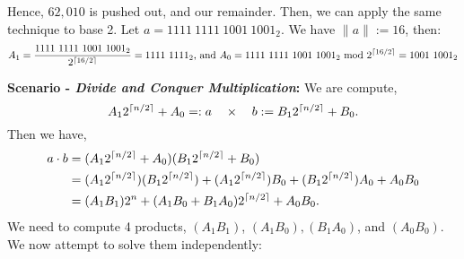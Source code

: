 \noindent
Hence, $62,010$ is pushed out, and our remainder. Then, we can apply the same technique to base 2.
Let $a=1111\ 1111\ 1001\ 1001_2$. We have $\|a\|:=16$, then:
\[ A_1=\frac{1111\ 1111\ 1001\ 1001_2}{2^{\ceil{16/2}}}=1111\ 1111_2 \text{, and } A_0=1111\ 1111\ 1001\ 1001_2 \text{ mod } 2^{\ceil{16/2}}=1001\ 1001_2 \]

\newpage
\noindent
\textbf{Scenario - \textit{Divide and Conquer Multiplication}:} We are compute, 
\[A_1 2^{\lceil n/2\rceil}+A_0=:a \quad \times \quad b:= B_1 2^{\lceil n/2\rceil}+B_0.\]
\noindent
Then we have,
\begin{align*}
    a\cdot b &=(A_1 2^{\lceil n/2\rceil}+A_0)(B_1 2^{\lceil n/2\rceil}+B_0)\\
    &=(A_1 2^{\lceil n/2\rceil})(B_1 2^{\lceil n/2\rceil})+(A_1 2^{\lceil n/2\rceil})B_0+(B_1 2^{\lceil n/2\rceil})A_0+A_0B_0\\
    &=(A_1B_1)2^{n}+(A_1B_0+B_1A_0)2^{\lceil n/2\rceil}+A_0B_0.
\end{align*}
\noindent
We need to compute 4 products, $(A_1B_1)$, $(A_1B_0), (B_1A_0)$, and $(A_0B_0)$. We now attempt to solve them independently:

